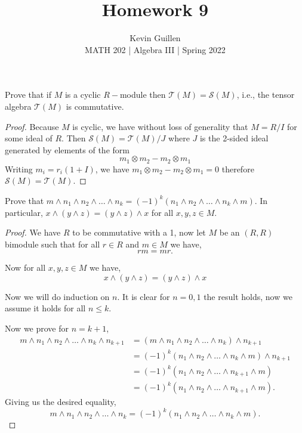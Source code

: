 \documentclass[11pt]{article}
\newenvironment{problem}[2][Problem\!]{\begin{tcolorbox}\begin{trivlist}
\item[\hskip \labelsep {\bfseries #1}\hskip \labelsep {\bfseries #2}]}{\end{trivlist}\end{tcolorbox}}
\renewcommand{\leq}{\leqslant}
\begin{document}
 
\title{Homework 9}
\author{Kevin Guillen\\[0.5em]
MATH 202 | Algebra III | Spring 2022}
\date{} 
\maketitle


\begin{problem} {11.5.1}
    Prove that if $M$ is a cyclic $R-$module then $\mathcal{T}(M) = \mathcal{S}(M)$, i.e., the tensor algebra $\mathcal{T}(M)$ is commutative.
\end{problem}
\begin{proof}
    Because $M$ is cyclic, we have without loss of generality that $M = R/I$ for some ideal of $R$. Then $\mathcal{S}(M) = \mathcal{T}(M)/J$ where $J$ is the 2-sided ideal generated by elements of the form 
    \[m_1 \otimes m_2 - m_2 \otimes m_1\]
    Writing $m_i = r_i(1 + I)$, we have $m_1 \otimes m_2 - m_2 \otimes m_1 = 0$ therefore $\mathcal{S}(M) = \mathcal{T}(M)$.  
\end{proof}

\vspace*{15pt}

\begin{problem} {11.5.4}
    Prove that $m\wedge n_1 \wedge n_2 \wedge \dots \wedge n_k = (-1)^{k}(n_1 \wedge n_2 \wedge \dots \wedge n_k \wedge m)$. In particular, $x\wedge (y \wedge z) = (y\wedge z)\wedge x$ for all $x,y,z \in M$.
\end{problem}
\begin{proof}
    We have $R$ to be commutative with a 1, now let $M$ be an $(R,R)$ bimodule such that for all $r \in R$ and $m \in M$ we have,
    \[rm = mr.\]

    Now for all $x,y,z \in M$ we have,
    \[x\wedge (y \wedge z) = (y \wedge z) \wedge x\]

    Now we will do induction on $n$. It is clear for $n = 0,1$ the result holds, now we assume it holds for all $n \leq k$. 

    Now we prove for $n = k +1$,
    \begin{align*}
        m \wedge n_1 \wedge n_2 \wedge \dots \wedge n_k \wedge n_{k + 1} &=  (m \wedge n_1 \wedge n_2 \wedge \dots \wedge n_k) \wedge n_{k + 1} \\
        &= (-1)^{k}(n_1 \wedge n_2 \wedge \dots \wedge n_k \wedge m) \wedge n_{k+1} \\
        &= (-1)^{k} (n_1 \wedge n_2 \wedge \dots \wedge n_{k+1}\wedge m) \\
        &= (-1)^{k}(n_1 \wedge n_2 \wedge \dots \wedge n_{k+1} \wedge m).
    \end{align*}
    Giving us the desired equality,
    \[m\wedge n_1 \wedge n_2 \wedge \dots \wedge n_k = (-1)^{k}(n_1 \wedge n_2 \wedge \dots \wedge n_k \wedge m).\]
\end{proof}
\end{document}
